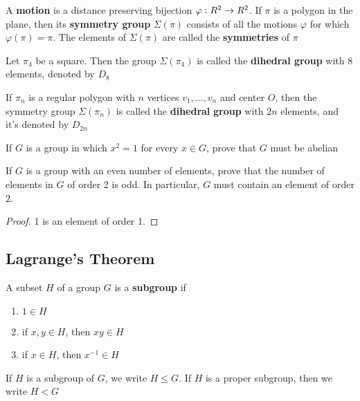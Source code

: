 \documentclass[11pt]{article}
\begin{document}
\begin{definition}[]
A \textbf{motion} is a distance preserving bijection \(\varphi:\relax{R}^2\to\relax{R}^2\). If
\(\pi\) is a polygon in the plane, then its \textbf{symmetry group} \(\Sigma(\pi)\)
consists of all the motions \(\varphi\) for which \(\varphi(\pi)=\pi\). The
elements of \(\Sigma(\pi)\) are called the \textbf{symmetries} of \(\pi\)
\end{definition}

Let \(\pi_4\) be a square. Then the group \(\Sigma(\pi_4)\) is called the
\textbf{dihedral group} with 8 elements, denoted by \(D_8\)

\begin{definition}[]
If \(\pi_n\) is a regular polygon with \(n\) vertices \(v_1,\dots,v_n\) and center
\(O\), then the symmetry group \(\Sigma(\pi_n)\) is called the \textbf{dihedral}
\textbf{group} with \(2n\) elements, and it's denoted by \(D_{2n}\)
\end{definition}

\begin{exercise}
\label{ex2.26}
If \(G\) is a group in which \(x^2=1\) for every \(x\in G\), prove that \(G\)
must be abelian
\end{exercise}

\begin{exercise}
\label{ex2.27}
If \(G\) is a group with an even number of elements, prove that the number of
elements in \(G\) of order 2 is odd. In particular, \(G\) must contain an element of
order 2.
\end{exercise}

\begin{proof}
1 is an element of order 1.
\end{proof}
\subsection{Lagrange's Theorem}
\label{sec:org9058b4b}


\begin{definition}[]
A subset \(H\) of a group \(G\) is a \textbf{subgroup} if
\begin{enumerate}
\item \(1\in H\)
\item if \(x,y\in H\), then \(xy\in H\)
\item if \(x\in H\), then \(x^{-1}\in H\)
\end{enumerate}
\end{definition}

If \(H\) is a subgroup of \(G\), we write \(H\le G\). If \(H\) is a proper subgroup,
then we write \(H<G\)
\end{document}
